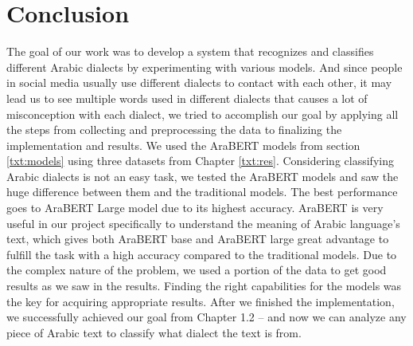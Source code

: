 \documentclass[12pt]{diazessay}
\begin{document}
    
    \section {Conclusion}
    The goal of our work was to develop a system that recognizes and classifies different Arabic dialects by experimenting with various models. And since people in social media usually use different dialects to contact with each other, it may lead us to see multiple words used in different dialects that causes a lot of misconception with each dialect, we tried to accomplish our goal by applying all the steps from collecting and preprocessing the data to finalizing the implementation and results. We used the AraBERT models from section \ref{txt:models} using three datasets from Chapter \ref{txt:res}. Considering classifying Arabic dialects is not an easy task, we tested the AraBERT models and saw the huge difference between them and the traditional models. The best performance goes to AraBERT Large model due to its highest accuracy. AraBERT is very useful in our project specifically to understand the meaning of Arabic language’s text, which gives both AraBERT base and AraBERT large great advantage to fulfill the task with a high accuracy compared to the traditional models. Due to the complex nature of the problem, we used a portion of the data to get good results as we saw in the results. Finding the right capabilities for the models was the key for acquiring appropriate results. After we finished the implementation, we successfully achieved our goal from Chapter 1.2 – and now we can analyze any piece of Arabic text to classify what dialect the text is from.



\newpage
\end{document}
